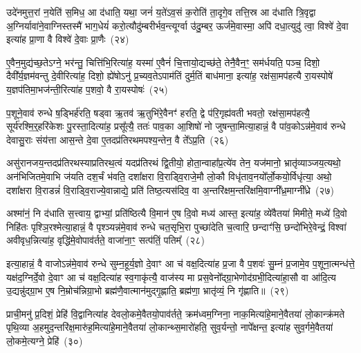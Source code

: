 {\anuvakamend[{दे॒वाः प्रा॑जाप॒त्यो वृ॒त्रश्चि॒रं पा॒प्मन॑श्चत्वारि॒ꣳ॒शच्च॑}]}%

उदे॑नमुत्त॒रां न॒येति॑ स॒मिध॒ आ द॑धाति॒ यथा॒ जनं॑ य॒ते॑\-ऽव॒सं क॒रोति॑ ता॒दृगे॒व तत्ति॒स्र आ द॑धाति त्रि॒वृद्वा अ॒ग्निर्यावा॑ने॒वाग्निस्तस्मै॑ भाग॒धेयं॑ करो॒त्यौदु॑म्बरीर्भव॒न्त्यूर्ग्वा उ॑दु॒म्बर॒ ऊर्ज॑मे॒वास्मा॒ अपि॑ दधा॒त्युदु॑ त्वा॒ विश्वे॑ दे॒वा इत्या॑ह प्रा॒णा वै विश्वे॑ दे॒वाः प्रा॒णैः~(२४)

ए॒वैन॒मुद्य॑च्छ॒ते\-ऽग्ने॒ भर॑न्तु॒ चित्ति॑भि॒रित्या॑ह॒ यस्मा॑ ए॒वैनं॑ चि॒त्तायो॒द्यच्छ॑ते॒ तेनै॒वैन॒ꣳ॒ सम॑र्धयति॒ पञ्च॒ दिशो॒ दैवी᳚र्य॒ज्ञम॑वन्तु दे॒वीरित्या॑ह॒ दिशो॒ ह्ये॑षो\-ऽनु॑ प्र॒च्यव॒ते\-ऽपाम॑तिं दुर्म॒तिं बाध॑माना॒ इत्या॑ह॒ रक्ष॑सा॒मप॑हत्यै रा॒यस्पोषे॑ य॒ज्ञप॑तिमा॒भज॑न्ती॒रित्या॑ह प॒शवो॒ वै रा॒यस्पोषः॑~(२५)

प॒शूने॒वाव॑ रुन्धे ष॒ड्भिर्\mbox{}ह॑रति॒ षड्वा ऋ॒तव॑ ऋ॒तुभि॑रे॒वैनꣳ॑ हरति॒ द्वे प॑रि॒गृह्य॑वती भवतो॒ रक्ष॑सा॒मप॑हत्यै॒ सूर्य॑रश्मि॒र्॒\mbox{}हरि॑केशः पु॒रस्ता॒दित्या॑ह॒ प्रसू᳚त्यै॒ ततः॑ पाव॒का आ॒शिषो॑ नो जुषन्ता॒मित्या॒हान्नं॒ वै पा॑व॒को\-ऽन्न॑मे॒वाव॑ रुन्धे देवासु॒राः संय॑त्ता आस॒न्ते दे॒वा ए॒तदप्र॑तिरथमपश्य॒न्तेन॒ वै ते᳚\-ऽप्र॒ति~(२६)

असु॑रानजय॒न्तदप्र॑तिरथस्याप्रतिरथ॒त्वं यदप्र॑तिरथं द्वि॒तीयो॒ होता॒न्वाहा᳚प्र॒त्ये॑व तेन॒ यज॑मानो॒ भ्रातृ॑व्याञ्जय॒त्यथो॒ अन॑भिजितमे॒वाभि ज॑यति दश॒र्चं भ॑वति॒ दशा᳚क्षरा वि॒राड्वि॒राजे॒मौ लो॒कौ विधृ॑ताव॒नयो᳚र्लो॒कयो॒र्विधृ॑त्या॒ अथो॒ दशा᳚क्षरा वि॒राडन्नं॑ वि॒राड्वि॒राज्ये॒वान्नाद्ये॒ प्रति॑ तिष्ठ॒त्यस॑दिव॒ वा अ॒न्तरि॑क्षम॒न्तरि॑क्षमि॒वाग्नी᳚ध्र॒माग्नी᳚ध्रे~(२७)

अश्मा॑नं॒ नि द॑धाति स॒त्त्वाय॒ द्वाभ्यां॒ प्रति॑ष्ठित्यै वि॒मान॑ ए॒ष दि॒वो मध्य॑ आस्त॒ इत्या॑ह॒ व्ये॑वैतया॑ मिमीते॒ मध्ये॑ दि॒वो निहि॑तः पृश्ञि॒रश्मेत्या॒हान्नं॒ वै पृश्ञ्यन्न॑मे॒वाव॑ रुन्धे चत॒सृभि॒रा पुच्छा॑देति च॒त्वारि॒ छन्दाꣳ॑सि॒ छन्दो॑भिरे॒वेन्द्रं॒ विश्वा॑ अवीवृध॒न्नित्या॑ह॒ वृद्धि॑मे॒वोपाव॑र्तते॒ वाजा॑ना॒ꣳ॒ सत्प॑तिं॒ पतिम्᳚~(२८)

इत्या॒हान्नं॒ वै वाजो\-ऽन्न॑मे॒वाव॑ रुन्धे सुम्न॒हूर्य॒ज्ञो दे॒वाꣳ आ च॑ वक्ष॒दित्या॑ह प्र॒जा वै प॒शवः॑ सु॒म्नं प्र॒जामे॒व प॒शूना॒त्मन्ध॑त्ते॒ यक्ष॑द॒ग्निर्दे॒वो दे॒वाꣳ आ च॑ वक्ष॒दित्या॑ह स्व॒गाकृ॑त्यै॒ वाज॑स्य मा प्रस॒वेनो᳚द्ग्रा॒भेणोद॑ग्रभी॒दित्या॑हा॒सौ वा आ॑दि॒त्य उ॒द्यन्नु॑द्ग्रा॒भ ए॒ष नि॒म्रोच॑न्निग्रा॒भो ब्रह्म॑णै॒वात्मान॑मुद्गृ॒ह्णाति॒ ब्रह्म॑णा॒ भ्रातृ॑व्यं॒ नि गृ॑ह्णाति॥~(२९)

{\anuvakamend[{प्रा॒णैः पोषो᳚\-ऽप्र॒त्याग्नी᳚ध्रे॒ पति॑मे॒ष दश॑ च}]}%

प्राची॒मनु॑ प्र॒दिशं॒ प्रेहि॑ वि॒द्वानित्या॑ह देवलो॒कमे॒वैतयो॒पाव॑र्तते॒ क्रम॑ध्वम॒ग्निना॒ नाक॒मित्या॑हे॒माने॒वैतया॑ लो॒कान्क्र॑मते पृथि॒व्या अ॒हमुद॒न्तरि॑क्ष॒मारु॑ह॒मित्या॑हे॒माने॒वैतया॑ लो॒कान्थ्स॒मारो॑हति॒ सुव॒र्यन्तो॒ नापे᳚क्षन्त॒ इत्या॑ह सुव॒र्गमे॒वैतया॑ लो॒कमे॒त्यग्ने॒ प्रेहि॑~(३०)

